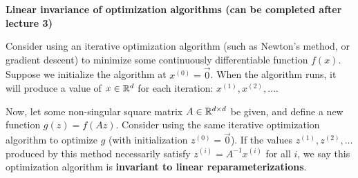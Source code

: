 \item {} {\bf Linear invariance of optimization algorithms (can be completed after lecture 3)}

Consider using an iterative optimization algorithm (such as Newton's method,
or gradient descent) to minimize some continuously differentiable
function $f(x)$.  Suppose we initialize the algorithm at $x^{(0)} = \vec{0}$.
When the algorithm
runs, it will produce a value of $x \in {\mathbb R}^{d}$ for each iteration:
$x^{(1)}, x^{(2)}, \ldots$.

Now, let some non-singular square matrix $A \in {\mathbb R}^{{d}\times {d}}$ be given, and
define a new function $g(z) = f(Az)$.  Consider using
the same iterative optimization algorithm to optimize $g$ (with initialization
$z^{(0)} = \vec{0}$). If the values $z^{(1)}, z^{(2)}, \ldots$ produced by this
method necessarily satisfy $z^{(i)} = A^{-1}x^{(i)}$ for all $i$, we say this
optimization algorithm is {\bf invariant to linear reparameterizations}.


\begin{enumerate}
        
        \ifnum{}
                
        \fi

        
        \ifnum{}
                
        \fi

\end{enumerate}
